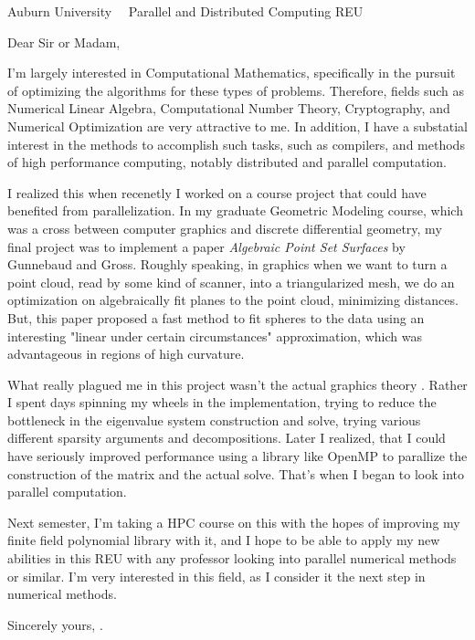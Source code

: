 \documentclass{scrlttr2}
\renewcommand{\\}{\ {\large\textperiodcentered}\ }
\begin{document}

\begin{letter}{ %
Auburn University\\
Parallel and Distributed Computing REU
}

\opening{Dear Sir or Madam,}

I'm largely interested in Computational Mathematics, specifically in the pursuit
of optimizing the algorithms for these types of problems. Therefore, fields such
as Numerical Linear Algebra, Computational Number Theory, Cryptography,
and Numerical Optimization are very attractive to me. In addition, I have a
substatial interest in the methods to accomplish such tasks, such as compilers,
and methods of high performance computing, notably distributed and parallel
computation.

I realized this when recenetly I worked on a course project that could have
benefited from parallelization. In my graduate Geometric Modeling course, which
was a cross between computer graphics and discrete differential geometry, my
final project was to implement a paper \textit{Algebraic Point Set Surfaces} by
Gunnebaud and Gross. Roughly speaking, in graphics when we want to turn a point
cloud, read by some kind of scanner, into a triangularized mesh, we do an
optimization on algebraically fit planes to the point cloud, minimizing
distances. But, this paper proposed a fast method to fit spheres to the data
using an interesting "linear under certain circumstances" approximation, which
was advantageous in regions of high curvature. 

What really plagued me in this project wasn't the actual graphics theory .
Rather I spent days spinning my wheels in the implementation, trying to reduce
the bottleneck in the eigenvalue system construction and solve, trying various
different sparsity arguments and decompositions. Later I realized, that I could
have seriously improved performance using a library like OpenMP to parallize the
construction of the matrix and the actual solve. That's when I began to look
into parallel computation. 

Next semester, I'm taking a HPC course on this with the hopes of improving my
finite field polynomial library with it, and I hope to be able to apply my
new abilities in this REU with any professor looking into parallel numerical
methods or similar. I'm very interested in this field, as I consider it the
next step in numerical methods.

Sincerely yours, .


\end{letter}
\end{document}
